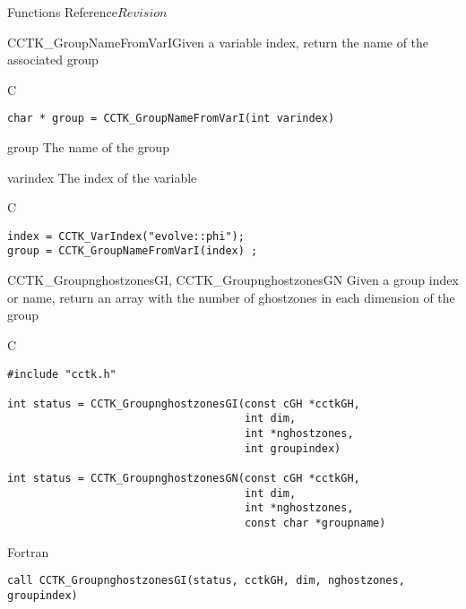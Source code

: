 \begin{cactuspart}{ Functions Reference}{}{$Revision$}
\begin{FunctionDescription}{CCTK\_GroupNameFromVarI}{Given a variable index, return the name of the associated group}
\label{CCTK-GroupNameFromVarI}
\begin{SynopsisSection}
\begin{Synopsis}{C}
\begin{verbatim}char * group = CCTK_GroupNameFromVarI(int varindex)\end{verbatim}
\end{Synopsis}
\end{SynopsisSection}
\begin{ParameterSection}
\begin{Parameter}{group}
The name of the group
\end{Parameter}
\begin{Parameter}{varindex}
The index of the variable
\end{Parameter}
\end{ParameterSection}

\begin{ExampleSection}
\begin{Example}{C}
\begin{verbatim}
index = CCTK_VarIndex("evolve::phi");
group = CCTK_GroupNameFromVarI(index) ;
\end{verbatim}
\end{Example}
\end{ExampleSection}
\end{FunctionDescription}



\begin{FunctionDescription}{CCTK\_GroupnghostzonesGI, CCTK\_GroupnghostzonesGN}
\label{CCTK-GroupnghostzonesGI}
\label{CCTK-GroupnghostzonesGN}
  Given a group index or name, return an array with the number of ghostzones in each dimension of the group
\begin{SynopsisSection}
\begin{Synopsis}{C}
\begin{verbatim}
#include "cctk.h"

int status = CCTK_GroupnghostzonesGI(const cGH *cctkGH,
                                     int dim,
                                     int *nghostzones,
                                     int groupindex)

int status = CCTK_GroupnghostzonesGN(const cGH *cctkGH,
                                     int dim,
                                     int *nghostzones,
                                     const char *groupname)
\end{verbatim}
\end{Synopsis}
\begin{Synopsis}{Fortran}
\begin{verbatim}
call CCTK_GroupnghostzonesGI(status, cctkGH, dim, nghostzones, groupindex)


\end{verbatim}
\end{Synopsis}
\end{SynopsisSection}
\end{FunctionDescription}
\end{cactuspart}
